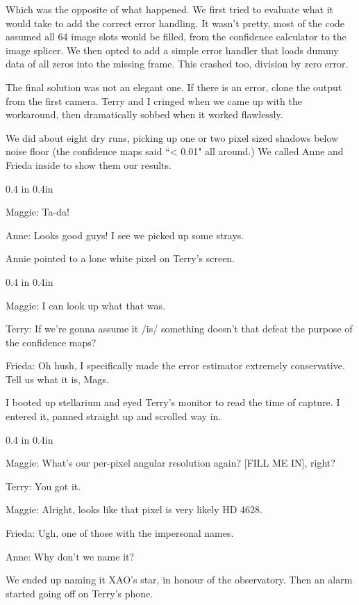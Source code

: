\documentclass[a5paper,10pt]{book}
\newenvironment{dialogue}
{
\it
\renewcommand{\:}{\rm:}
\PushPreHook{par}{\it}

\begin{changemargin}{ 0.4 in}{ 0.4in}
\addtolength{\parskip}{0.1em}
}
{
\addtolength{\parskip}{-0.1em}
\end{changemargin}

\PopPreHook{par}
}
\begin{document}
Which was the opposite of what happened. We first tried to evaluate what it would take to add the correct error handling. It wasn't pretty, most of the code assumed all 64 image slots would be filled, from the confidence calculator to the image splicer. We then opted to add a simple error handler that loads dummy data of all zeros into the missing frame. This crashed too, division by zero error.

The final solution was not an elegant one. If there is an error, clone the output from the first camera. Terry and I cringed when we came up with the workaround, then dramatically sobbed when it worked flawlessly.

We did about eight dry runs, picking up one or two pixel sized shadows below noise floor (the confidence maps said ``< 0.01" all around.) We called Anne and Frieda inside to show them our results.

\begin{dialogue}
  Maggie\: Ta-da!

  Anne\: Looks good guys! I see we picked up some strays.
\end{dialogue}

Annie pointed to a lone white pixel on Terry's screen.

\begin{dialogue}
  Maggie\: I can look up what that was.

  Terry\: If we're gonna assume it /is/ something doesn't that defeat the purpose of the confidence maps?

  Frieda\: Oh hush, I specifically made the error estimator extremely conservative. Tell us what it is, Mags.
\end{dialogue}

I booted up stellarium and eyed Terry's monitor to read the time of capture. I entered it, panned straight up and scrolled way in.

\begin{dialogue}
  Maggie\: What's our per-pixel angular resolution again? [FILL ME IN], right?

  Terry\: You got it.

  Maggie\: Alright, looks like that pixel is very likely HD 4628.

  Frieda\: Ugh, one of those with the impersonal names.

  Anne\: Why don't we name it?
\end{dialogue}

We ended up naming it XAO's star, in honour of the observatory. Then an alarm started going off on Terry's phone.
\end{document}
